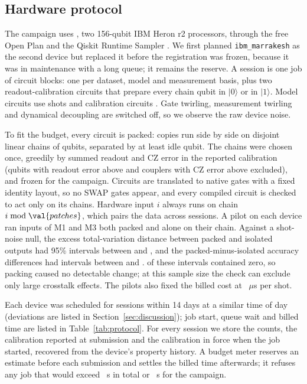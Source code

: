 \subsection{Hardware protocol}
The campaign uses , two 156-qubit IBM Heron r2 processors, through the free Open
Plan and the Qiskit Runtime Sampler \cite{javadiabhari2024qiskit}. We first planned
\texttt{ibm\_marrakesh} as the second device but replaced it before the registration was frozen,
because it was in maintenance with a long queue; it remains the reserve. A session is one job of
 circuit blocks: one per dataset, model and measurement basis, plus two
readout-calibration circuits that prepare every chain qubit in $|0\rangle$ or in $|1\rangle$. Model
circuits use  shots and calibration circuits . Gate twirling,
measurement twirling and dynamical decoupling are switched off, so we observe the raw device
noise.

To fit the budget, every circuit is packed:  copies run side by side on disjoint
linear chains of  qubits, separated by at least  idle qubit. The
chains were chosen once, greedily by summed readout and CZ error in the reported calibration
(qubits with readout error above  and couplers with CZ error above
 excluded), and frozen for the campaign. Circuits are translated to native
gates with a fixed identity layout, so no SWAP gates appear, and every compiled circuit is
checked to act only on its chains. Hardware input $i$ always runs on chain $i \bmod
\val{patches}$, which pairs the data across sessions. A pilot on each device ran
 inputs of M1 and M3 both packed and alone on their chain. Against a
shot-noise null, the excess total-variation distance between packed and isolated outputs had
95\% intervals between  and , and the
packed-minus-isolated accuracy differences had intervals between  and
.  of these intervals contained zero, so packing caused
no detectable change; at this sample size the check can exclude only large crosstalk effects.
The pilots also fixed the billed cost at ~$\mu$s per shot.

Each device was scheduled for  sessions within 14 days at a similar time
of day (deviations are listed in Section~\ref{sec:discussion}); job start, queue wait and billed time are listed in Table~\ref{tab:protocol}. For
every session we store the counts, the calibration reported at submission and the calibration
in force when the job started, recovered from the device's property history. A budget meter
reserves an estimate before each submission and settles the billed time afterwards; it refuses
any job that would exceed ~s in total or ~s for the campaign.

